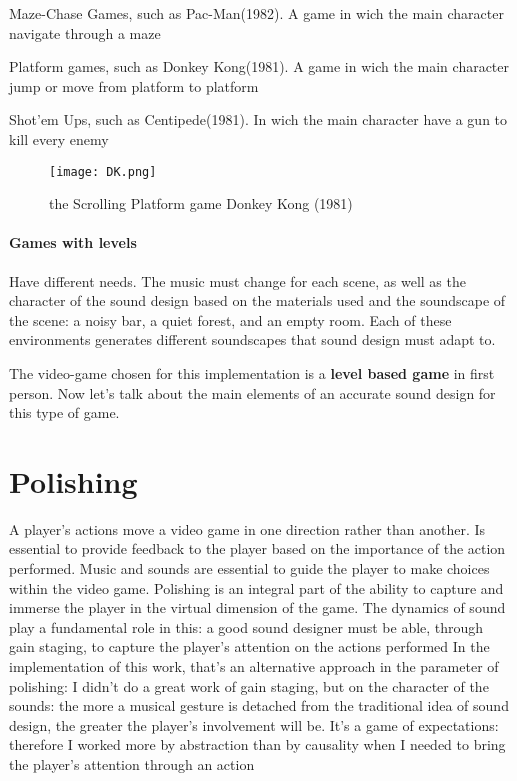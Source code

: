 		\begin{compactitem}
			\item Maze-Chase Games, such as Pac-Man(1982). A game in wich the main character navigate through a maze
			\item Platform games, such as Donkey Kong(1981). A game in wich the main character jump or move from platform to platform
			\item Shot'em Ups, such as Centipede(1981). In wich the main character have a gun to kill every enemy
		\end{compactitem}
	
	\begin{figure}[h]
		\begin{center}
			\texttt{[image: DK.png]}
			\caption{the Scrolling Platform game Donkey Kong (1981)}
		\end{center}
	\end{figure}
	
	\paragraph{Games with levels} Have different needs. The music must change for each scene, as well as the character of the sound design based on the materials used and the soundscape of the scene: a noisy bar, a quiet forest, and an empty room. Each of these environments generates different soundscapes that sound design must adapt to.
	
The video-game chosen for this implementation is a \textbf{level based game} in first person. Now let's talk about the main elements of an accurate sound design for this type of game.

\section{Polishing}

A player's actions move a video game in one direction rather than another. Is essential to provide feedback to the player based on the importance of the action performed. Music and sounds are essential to guide the player to make choices within the video game. Polishing is an integral part of the ability to capture and immerse the player in the virtual dimension of the game. The dynamics of sound play a fundamental role in this: a good sound designer must be able, through gain staging, to capture the player's attention on the actions performed
In the implementation of this work, that's an alternative approach in the parameter of polishing: I didn't do a great work of gain staging, but on the character of the sounds: the more a musical gesture is detached from the traditional idea of ​​sound design, the greater the player's involvement will be. It's a game of expectations: therefore I worked more by abstraction than by causality when I needed to bring the player's attention through an action

